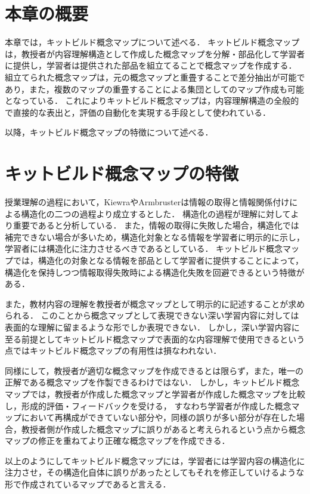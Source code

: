 \section{本章の概要}
本章では，キットビルド概念マップについて述べる．
キットビルド概念マップ\cite{kit}\cite{kit2}は，教授者が内容理解構造として作成した概念マップを分解・部品化して学習者に提供し，学習者は提供された部品を組立てることで概念マップを作成する．
組立てられた概念マップは，元の概念マップと重畳することで差分抽出が可能であり，また，複数のマップの重畳することによる集団としてのマップ作成も可能となっている．
これによりキットビルド概念マップは，内容理解構造の全般的で直接的な表出と，評価の自動化を実現する手段として使われている．

以降，キットビルド概念マップの特徴について述べる．

\section{キットビルド概念マップの特徴}
授業理解の過程において，Kiewra\cite{kiewra}やArmbruster\cite{armbruster}は情報の取得と情報関係付けによる構造化の二つの過程より成立するとした．
構造化の過程が理解に対してより重要であると分析している．
また，情報の取得に失敗した場合，構造化では補完できない場合が多いため，構造化対象となる情報を学習者に明示的に示し，学習者には構造化に注力させるべきであるとしている．
キットビルド概念マップでは，構造化の対象となる情報を部品として学習者に提供することによって，構造化を保持しつつ情報取得失敗時による構造化失敗を回避できるという特徴がある．

また，教材内容の理解を教授者が概念マップとして明示的に記述することが求められる．
このことから概念マップとして表現できない深い学習内容に対しては表面的な理解に留まるような形でしか表現できない．
しかし，深い学習内容に至る前提としてキットビルド概念マップで表面的な内容理解で使用できるという点ではキットビルド概念マップの有用性は損なわれない．

同様にして，教授者が適切な概念マップを作成できるとは限らず，また，唯一の正解である概念マップを作製できるわけではない．
しかし，キットビルド概念マップでは，教授者が作成した概念マップと学習者が作成した概念マップを比較し，形成的評価・フィードバックを受ける，
すなわち学習者が作成した概念マップにおいて再構成ができていない部分や，同様の誤りが多い部分が存在した場合，教授者側が作成した概念マップに誤りがあると考えられるという点から概念マップの修正を重ねてより正確な概念マップを作成できる．

以上のようにしてキットビルド概念マップには，学習者には学習内容の構造化に注力させ，その構造化自体に誤りがあったとしてもそれを修正していけるような形で作成されているマップであると言える．